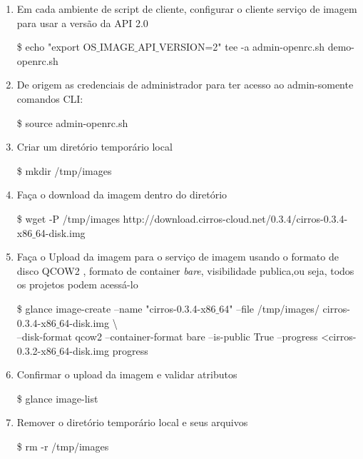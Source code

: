 \begin{enumerate}
	\item Em cada ambiente de script de cliente, configurar o cliente serviço de imagem para usar a versão da API 2.0
		\begin{snugshade}
			\$ echo "export OS$\_$IMAGE$\_$API$\_$VERSION=2" \textbar tee -a admin-openrc.sh demo-openrc.sh
		\end{snugshade}		
	
	\item De origem as credenciais de administrador para ter acesso ao admin-somente comandos CLI:
		\begin{snugshade}
			\$ source admin-openrc.sh
		\end{snugshade}			
		
	\item Criar um diretório temporário local
		\begin{snugshade}
			\$ mkdir /tmp/images
		\end{snugshade}					
		
	\item Faça o download da imagem dentro do diretório
		\begin{snugshade}
			\$ wget -P /tmp/images http://download.cirros-cloud.net/0.3.4/cirros-0.3.4-
x86$\_$64-disk.img
		\end{snugshade}							
		
	\item Faça o Upload da imagem para o serviço de imagem usando o formato de disco QCOW2 , formato de container \emph{bare}, visibilidade publica,ou seja, todos os projetos podem acessá-lo
		\begin{snugshade}
			\$ glance image-create --name "cirros-0.3.4-x86$\_$64" --file /tmp/images/
cirros-0.3.4-x86$\_$64-disk.img \textbackslash \\
--disk-format qcow2 --container-format bare --is-public True --progress \textless cirros-0.3.2-x86$\_$64-disk.img
progress
		\end{snugshade}						
	
	\item Confirmar o upload da imagem e validar atributos
		\begin{snugshade}
			\$ glance image-list
		\end{snugshade}			
		
	\item Remover o diretório temporário local e seus arquivos
		\begin{snugshade}
			\$ rm -r /tmp/images
		\end{snugshade}									
\end{enumerate}
